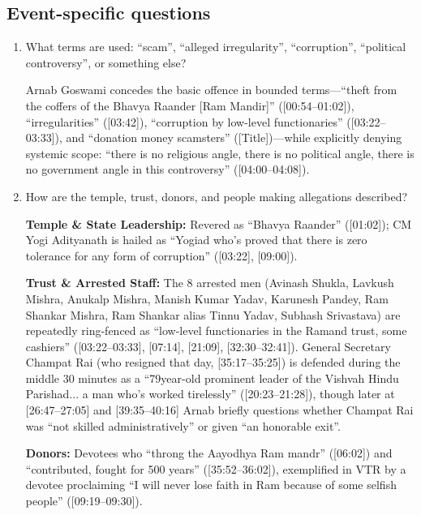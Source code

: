 \documentclass[10pt,a4paper]{article}
\begin{document}
\subsection*{Event-specific questions}
\begin{enumerate}[leftmargin=1.5em, itemsep=6pt, topsep=4pt]
  \item What terms are used: ``scam'', ``alleged irregularity'', ``corruption'', ``political controversy'', or something else?\par\smallskip
  Arnab Goswami concedes the basic offence in bounded terms---``theft from the coffers of the Bhavya Raander [Ram Mandir]'' ([00:54--01:02]), ``irregularities'' ([03:42]), ``corruption by low-level functionaries'' ([03:22--03:33]), and ``donation money scamsters'' ([Title])---while explicitly denying systemic scope: ``there is no religious angle, there is no political angle, there is no government angle in this controversy'' ([04:00--04:08]).
  \item How are the temple, trust, donors, and people making allegations described?\par\smallskip
  \textbf{Temple \& State Leadership:} Revered as ``Bhavya Raander'' ([01:02]); CM Yogi Adityanath is hailed as ``Yogiad who's proved that there is zero tolerance for any form of corruption'' ([03:22], [09:00]).

  \textbf{Trust \& Arrested Staff:} The 8 arrested men (Avinash Shukla, Lavkush Mishra, Anukalp Mishra, Manish Kumar Yadav, Karunesh Pandey, Ram Shankar Mishra, Ram Shankar alias Tinnu Yadav, Subhash Srivastava) are repeatedly ring-fenced as ``low-level functionaries in the Ramand trust, some cashiers'' ([03:22--03:33], [07:14], [21:09], [32:30--32:41]). General Secretary Champat Rai (who resigned that day, [35:17--35:25]) is defended during the middle 30 minutes as a ``79year-old prominent leader of the Vishvah Hindu Parishad... a man who's worked tirelessly'' ([20:23--21:28]), though later at [26:47--27:05] and [39:35--40:16] Arnab briefly questions whether Champat Rai was ``not skilled administratively'' or given ``an honorable exit''.

  \textbf{Donors:} Devotees who ``throng the Aayodhya Ram mandr'' ([06:02]) and ``contributed, fought for 500 years'' ([35:52--36:02]), exemplified in VTR by a devotee proclaiming ``I will never lose faith in Ram because of some selfish people'' ([09:19--09:30]).


\end{enumerate}
\end{document}

